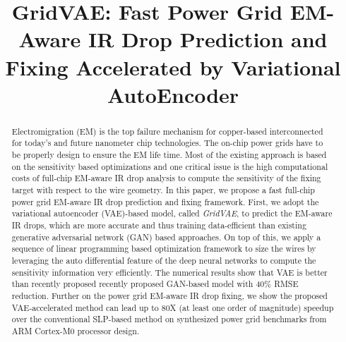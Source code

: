 \documentclass[journal]{IEEEtran}
\begin{document}
\title{GridVAE: Fast Power Grid EM-Aware IR Drop Prediction and Fixing
  Accelerated by Variational AutoEncoder}



\maketitle
  
\begin{abstract}
  Electromigration (EM) is the top failure mechanism for copper-based
  interconnected for today's and future nanometer chip technologies.
  The on-chip power grids have to be properly design to ensure the EM
  life time. Most of the existing approach is based on the sensitivity
  based optimizations and one critical issue is the high computational
  costs of full-chip EM-aware IR drop analysis to compute the
  sensitivity of the fixing target with respect to the wire
  geometry. In this paper, we propose a fast full-chip power grid
  EM-aware IR drop prediction and fixing framework. First, we adopt
  the variational autoencoder (VAE)-based model, called {\it GridVAE},
  to predict the EM-aware IR drops, which are more accurate and thus
  training data-efficient than existing generative adversarial network
  (GAN) based approaches. On top of this, we apply a sequence of
  linear programming based optimization framework to size the wires by
  leveraging the auto differential feature of the deep neural networks
  to compute the sensitivity information very efficiently.  The
  numerical results show that VAE is better than recently proposed
  recently proposed GAN-based model with 40$\%$ RMSE reduction.
  Further on the power grid EM-aware IR drop fixing, we show the
  proposed VAE-accelerated method can lead up to 80X (at least one
  order of magnitude) speedup over the conventional SLP-based method
  on synthesized power grid benchmarks from ARM Cortex-M0 processor
  design.

\end{abstract}
 





\end{document}
